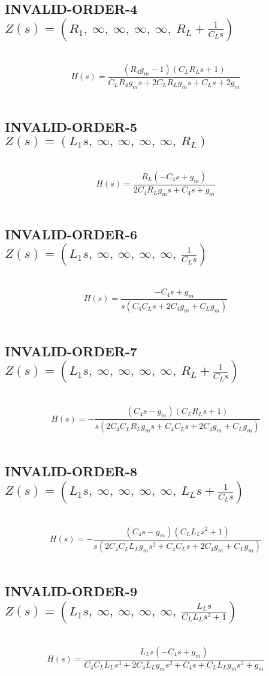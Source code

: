 \documentclass{article}
\begin{document}
\subsection{INVALID-ORDER-4 $Z(s) = \left( R_{1}, \  \infty, \  \infty, \  \infty, \  \infty, \  R_{L} + \frac{1}{C_{L} s}\right)$ } \ 
\textbf{\[H(s) = \frac{\left(R_{4} g_{m} - 1\right) \left(C_{L} R_{L} s + 1\right)}{C_{L} R_{4} g_{m} s + 2 C_{L} R_{L} g_{m} s + C_{L} s + 2 g_{m}}\] } \ 
\subsection{INVALID-ORDER-5 $Z(s) = \left( L_{1} s, \  \infty, \  \infty, \  \infty, \  \infty, \  R_{L}\right)$ } \ 
\textbf{\[H(s) = \frac{R_{L} \left(- C_{4} s + g_{m}\right)}{2 C_{4} R_{L} g_{m} s + C_{4} s + g_{m}}\] } \ 
\subsection{INVALID-ORDER-6 $Z(s) = \left( L_{1} s, \  \infty, \  \infty, \  \infty, \  \infty, \  \frac{1}{C_{L} s}\right)$ } \ 
\textbf{\[H(s) = \frac{- C_{4} s + g_{m}}{s \left(C_{4} C_{L} s + 2 C_{4} g_{m} + C_{L} g_{m}\right)}\] } \ 
\subsection{INVALID-ORDER-7 $Z(s) = \left( L_{1} s, \  \infty, \  \infty, \  \infty, \  \infty, \  R_{L} + \frac{1}{C_{L} s}\right)$ } \ 
\textbf{\[H(s) = - \frac{\left(C_{4} s - g_{m}\right) \left(C_{L} R_{L} s + 1\right)}{s \left(2 C_{4} C_{L} R_{L} g_{m} s + C_{4} C_{L} s + 2 C_{4} g_{m} + C_{L} g_{m}\right)}\] } \ 
\subsection{INVALID-ORDER-8 $Z(s) = \left( L_{1} s, \  \infty, \  \infty, \  \infty, \  \infty, \  L_{L} s + \frac{1}{C_{L} s}\right)$ } \ 
\textbf{\[H(s) = - \frac{\left(C_{4} s - g_{m}\right) \left(C_{L} L_{L} s^{2} + 1\right)}{s \left(2 C_{4} C_{L} L_{L} g_{m} s^{2} + C_{4} C_{L} s + 2 C_{4} g_{m} + C_{L} g_{m}\right)}\] } \ 
\subsection{INVALID-ORDER-9 $Z(s) = \left( L_{1} s, \  \infty, \  \infty, \  \infty, \  \infty, \  \frac{L_{L} s}{C_{L} L_{L} s^{2} + 1}\right)$ } \ 
\textbf{\[H(s) = \frac{L_{L} s \left(- C_{4} s + g_{m}\right)}{C_{4} C_{L} L_{L} s^{3} + 2 C_{4} L_{L} g_{m} s^{2} + C_{4} s + C_{L} L_{L} g_{m} s^{2} + g_{m}}\] } \ 
\end{document}
